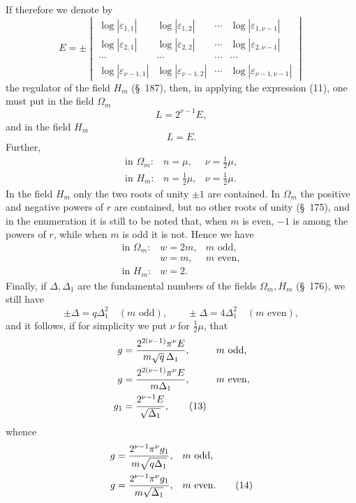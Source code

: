 \documentclass[11pt]{article}
\providecommand{\eps}{\varepsilon}
\providecommand{\eps}{\varepsilon}
\begin{document}
If therefore we denote by
\begin{equation}
E=\pm\begin{vmatrix}
\log|\eps_{1,1}|&\log|\eps_{1,2}|&\cdots&\log|\eps_{1,\nu-1}|\\
\log|\eps_{2,1}|&\log|\eps_{2,2}|&\cdots&\log|\eps_{2,\nu-1}|\\
\cdots&\cdots&\cdots&\cdots\\
\log|\eps_{\nu-1,1}|&\log|\eps_{\nu-1,2}|&\cdots&\log|\eps_{\nu-1,\nu-1}|
\end{vmatrix}
\tag{12}
\end{equation}
the regulator of the field $H_m$ (\S~187), then, in applying the expression (11), one must put in the field $\Omega_m$
\[
L=2^{\nu-1}E,
\]
and in the field $H_m$
\[
L=E.
\]
Further,
\[
\begin{array}{lll}
\text{in }\Omega_m: & n=\mu, & \nu=\frac12\mu,\\
\text{in }H_m: & n=\frac12\mu, & \nu=\frac12\mu.
\end{array}
\]
In the field $H_m$ only the two roots of unity $\pm1$ are contained. In $\Omega_m$ the positive and negative powers of $r$ are contained, but no other roots of unity (\S~175), and in the enumeration it is still to be noted that, when $m$ is even, $-1$ is among the powers of $r$, while when $m$ is odd it is not. Hence we have
\[
\begin{array}{lll}
\text{in }\Omega_m: & w=2m, & m\text{ odd},\\
& w=m, & m\text{ even},\\
\text{in }H_m: & w=2.&
\end{array}
\]
Finally, if $\Delta,\Delta_1$ are the fundamental numbers of the fields $\Omega_m,H_m$ (\S~176), we still have
\[
\pm\Delta=q\Delta_1^2\quad(m\text{ odd}),
\qquad
\pm\Delta=4\Delta_1^2\quad(m\text{ even}),
\]
and it follows, if for simplicity we put $\nu$ for $\frac12\mu$, that
\begin{align}
g&=\frac{2^{2(\nu-1)}\pi^\nu E}{m\sqrt q\,\Delta_1}, &&m\text{ odd},\notag\\
g&=\frac{2^{2(\nu-1)}\pi^\nu E}{m\Delta_1}, &&m\text{ even},\notag\\
g_1&=\frac{2^{\nu-1}E}{\sqrt{\Delta_1}},\tag{13}
\end{align}
whence
\begin{align}
g&=\frac{2^{\nu-1}\pi^\nu g_1}{m\sqrt{q\Delta_1}}, &&m\text{ odd},\notag\\
g&=\frac{2^{\nu-1}\pi^\nu g_1}{m\sqrt{\Delta_1}}, &&m\text{ even}.\tag{14}
\end{align}
\end{document}
